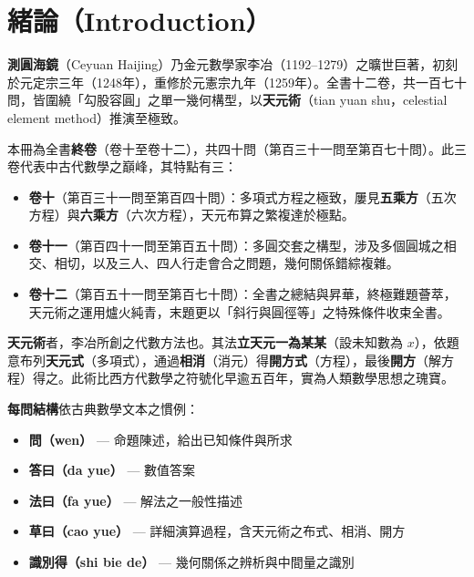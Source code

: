 \documentclass[11pt,a4paper]{article}
\begin{document}
\section*{緒論（Introduction）}

\begin{framed}
\noindent\textbf{測圓海鏡}（Ce\-yuan Haijing）乃金元數學家李冶（1192--1279）之曠世巨著，初刻於元定宗三年（1248年），重修於元憲宗九年（1259年）。全書十二卷，共一百七十問，皆圍繞「勾股容圓」之單一幾何構型，以\textbf{天元術}（tian yuan shu，celestial element method）推演至極致。
\end{framed}

\vspace{0.3cm}

本冊為全書\textbf{終卷}（卷十至卷十二），共四十問（第百三十一問至第百七十問）。此三卷代表中古代數學之巔峰，其特點有三：

\begin{itemize}[leftmargin=2em]
  \item \textbf{卷十}（第百三十一問至第百四十問）：多項式方程之極致，屢見\textbf{五乘方}（五次方程）與\textbf{六乘方}（六次方程），天元布算之繁複達於極點。
  \item \textbf{卷十一}（第百四十一問至第百五十問）：多圓交套之構型，涉及多個圓城之相交、相切，以及三人、四人行走會合之問題，幾何關係錯綜複雜。
  \item \textbf{卷十二}（第百五十一問至第百七十問）：全書之總結與昇華，終極難題薈萃，天元術之運用爐火純青，末題更以「斜行與圓徑等」之特殊條件收束全書。
\end{itemize}

\vspace{0.3cm}
\textbf{天元術}者，李冶所創之代數方法也。其法\textbf{立天元一為某某}（設未知數為 $x$），依題意布列\textbf{天元式}（多項式），通過\textbf{相消}（消元）得\textbf{開方式}（方程），最後\textbf{開方}（解方程）得之。此術比西方代數學之符號化早逾五百年，實為人類數學思想之瑰寶。

\vspace{0.5cm}
\textbf{每問結構}依古典數學文本之慣例：
\begin{itemize}[leftmargin=2em]
  \item \textbf{問（wen）} --- 命題陳述，給出已知條件與所求
  \item \textbf{答曰（da yue）} --- 數值答案
  \item \textbf{法曰（fa yue）} --- 解法之一般性描述
  \item \textbf{草曰（cao yue）} --- 詳細演算過程，含天元術之布式、相消、開方
  \item \textbf{識別得（shi bie de）} --- 幾何關係之辨析與中間量之識別
\end{itemize}
\end{document}
